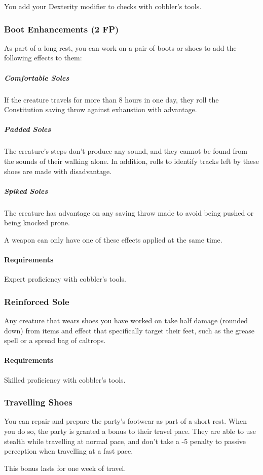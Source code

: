         You add your Dexterity modifier to checks with cobbler's tools.
    \subsubsection{Boot Enhancements (2 FP)} \label{feat::bootenhancements}
        As part of a long rest, you can work on a pair of boots or shoes to add the following effects to them:
        \subparagraph{Comfortable Soles} If the creature travels for more than 8 hours in one day, they roll the Constitution saving throw against exhaustion with advantage.
        \subparagraph{Padded Soles} The creature's steps don't produce any sound, and they cannot be found from the sounds of their walking alone.
        In addition, rolls to identify tracks left by these shoes are made with disadvantage.
        \subparagraph{Spiked Soles} The creature has advantage on any saving throw made to avoid being pushed or being knocked prone.

        A weapon can only have one of these effects applied at the same time.
        \paragraph{Requirements} Expert proficiency with cobbler's tools.
    \subsubsection{Reinforced Sole} \label{feat::reinforcedsole}
        Any creature that wears shoes you have worked on take half damage (rounded down) from items and effect that specifically target their feet, such as the grease spell or a spread bag of caltrops.
        \paragraph{Requirements} Skilled proficiency with cobbler's tools.
    \subsubsection{Travelling Shoes} \label{feat::travellingshoes}
        You can repair and prepare the party's footwear as part of a short rest.
        When you do so, the party is granted a bonus to their travel pace.
        They are able to use stealth while travelling at normal pace, and don't take a -5 penalty to passive perception when travelling at a fast pace.

        This bonus lasts for one week of travel.
